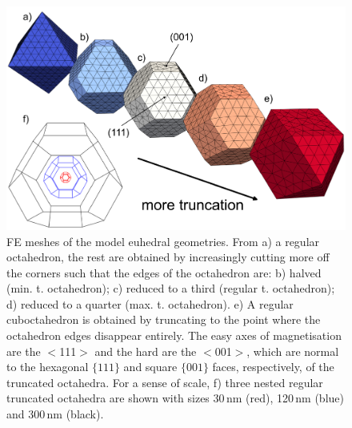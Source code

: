 \documentclass[review,authoryear]{elsarticle}
\newcommand{\nm}{\,\text{nm}}
\begin{document}
\begin{figure}[ht]
\centering
\includegraphics[width=\textwidth]{Figure_01.pdf}
\caption{FE meshes of the model euhedral geometries. From a) a regular octahedron, the rest are obtained by increasingly cutting more off the corners such that the edges of the octahedron are: b) halved (min. t. octahedron); c) reduced to a third (regular t. octahedron); d) reduced to a quarter (max. t. octahedron). e) A regular cuboctahedron is obtained by truncating to the point where the octahedron edges disappear entirely. The easy axes of magnetisation are the $<$111$>$ and the hard are the $<$001$>$, which are normal to the hexagonal $\{111\}$ and square $\{001\}$ faces, respectively, of the truncated octahedra. For a sense of scale, f) three nested regular truncated octahedra are shown with sizes 30$\nm$ (red), 120$\nm$ (blue) and 300$\nm$ (black).}
\label{fig1}
\end{figure}
\end{document}
